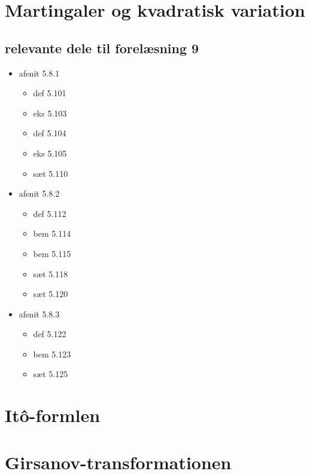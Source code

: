 \documentclass{article}
\numberwithin{equation}{section}
\begin{document}
\newpage

\section{Martingaler og kvadratisk variation}

\subsection*{relevante dele til forelæsning 9}
\begin{itemize}
    \item afsnit 5.8.1
    \begin{itemize}
        \item def 5.101
        \item eks 5.103
        \item def 5.104
        \item eks 5.105
        \item sæt 5.110
    \end{itemize}
    \item afsnit 5.8.2
    \begin{itemize}
        \item def 5.112
        \item bem 5.114
        \item bem 5.115
        \item sæt 5.118
        \item sæt 5.120
    \end{itemize}
    \item afsnit 5.8.3
    \begin{itemize}
        \item def 5.122
        \item bem 5.123
        \item sæt 5.125
    \end{itemize}
\end{itemize}

\newpage

\section{Itô-formlen}

\newpage

\section{Girsanov-transformationen}
\end{document}
